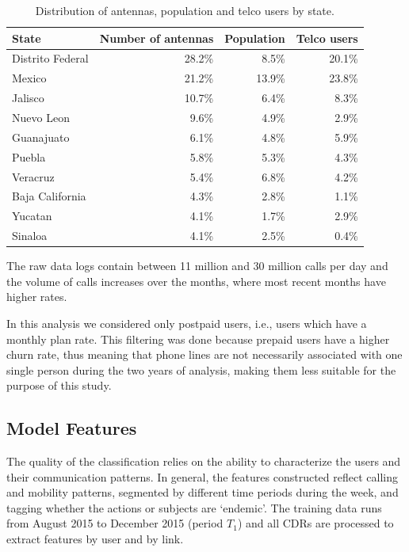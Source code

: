 \begin{table}[ht]
\caption{Distribution of antennas, population and telco users by state.}
\label{tab:distribution_by_state}
\centering
\begin{tabular}{l r r r}
\toprule
State				& Number of antennas & Population 	& Telco users \\
\midrule
Distrito Federal    & 28.2\% 	& 8.5\%		& 20.1\%  \\
Mexico              & 21.2\%		&  13.9\% 	& 23.8\%  \\
Jalisco             & 10.7\% 	& 6.4\%		& 8.3\%   \\
Nuevo Leon          & 9.6\%	& 4.9\%		& 2.9\% \\
Guanajuato          & 6.1\%	& 4.8\%		& 5.9\% \\
Puebla              & 5.8\%	& 5.3\%		& 4.3\% \\
Veracruz            & 5.4\% 	& 6.8\%		& 4.2\% \\
Baja California     & 4.3\%	& 2.8\%		& 1.1\% \\
Yucatan             & 4.1\%	& 1.7\%		& 2.9\% \\
Sinaloa             & 4.1\%	& 2.5\%		& 0.4\% \\
\bottomrule
\end{tabular}
\end{table}

The raw data logs contain between 11 million and 30 million calls per day and the volume of calls increases over the months, where most recent months have higher rates.

In this analysis we considered only postpaid users, i.e., users which have a monthly  plan rate. This filtering was done because prepaid users have a higher churn rate, thus meaning that phone lines are not necessarily associated with one single person during the two years of analysis, making them less suitable for the purpose of this study.




\subsection{Model Features}

The quality of the classification relies on the ability to characterize the users and their communication patterns. %
In general, the features constructed reflect calling and mobility patterns,
segmented by different time periods during the week, and tagging whether the actions or subjects are `endemic'. 
The training data runs from August 2015 to December 2015 (period $T_1$) and all CDRs are processed to extract features by user and by link. 

